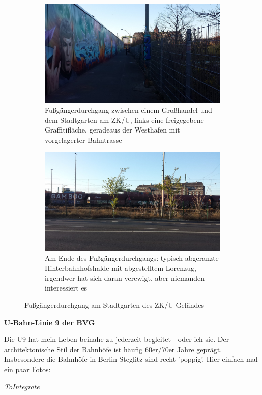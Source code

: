 \begin{figure}[h]
\centering
	\begin{subfigure}[b]{0.49\textwidth}
    \includegraphics[width=1.0\textwidth]{img/inspiration/westhafen_view_preDurchgang.jpg}
   \caption{Fu{\ss}g\"angerdurchgang zwischen einem Gro{\ss}handel und dem Stadtgarten am ZK/U, links eine freigegebene Graffitifl\"ache, geradeaus der Westhafen mit vorgelagerter Bahntrasse}
    \label{img:inspiration_westhafen_view_preDurchgang}
    \end{subfigure}
	\begin{subfigure}[b]{0.49\textwidth}
    \includegraphics[width=1.0\textwidth]{img/inspiration/westhafen_view_postDurchgang.jpg}
   \caption{Am Ende des Fu{\ss}g\"angerdurchgangs: typisch abgeranzte Hinterbahnhofshalde mit abgestelltem Lorenzug, irgendwer hat sich daran verewigt, aber niemanden interessiert es}
    \label{img:inspiration_westhafen_view_postDurchgang}
    \end{subfigure}
	\caption{Fu{\ss}g\"angerdurchgang am Stadtgarten des ZK/U Gel\"andes}
	\label{img:inspiration_westhafen_view_durchgang}
\end{figure}



\textbf{U-Bahn-Linie 9 der BVG}

Die U9 hat mein Leben beinahe zu jederzeit begleitet - oder ich sie.
Der architektonische Stil der Bahnh\"ofe ist h\"aufig 60er/70er Jahre gepr\"agt.
Insbesondere die Bahnh\"ofe in Berlin-Steglitz sind recht 'poppig'.
Hier einfach mal ein paar Fotos:

\textit{ToIntegrate}

